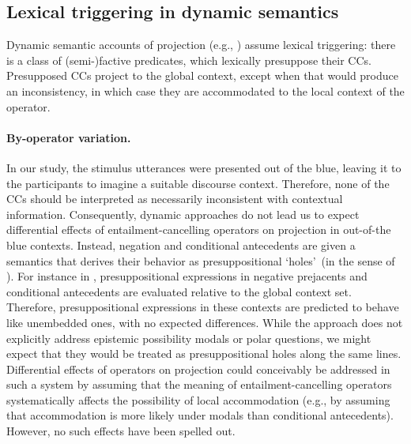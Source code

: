 \documentclass[a4paper,12pt,twoside]{article}
\begin{document}
	\subsection{Lexical triggering in dynamic semantics}

		Dynamic semantic accounts of projection (e.g., \citealt{heim_projection_1983,heim_presupposition_1992,van_der_sandt_presupposition_1992}) assume lexical triggering: there is a class of (semi-)factive predicates, which lexically presuppose their CCs. Presupposed CCs project to the global context, except when that would produce an inconsistency, in which case they are accommodated to the local context of the operator.

		\paragraph{By-operator variation.} In our study, the stimulus utterances were presented out of the blue, leaving it to the participants to imagine a suitable discourse context. Therefore, none of the CCs should be interpreted as necessarily inconsistent with contextual information.
		Consequently, dynamic approaches do not lead us to expect differential effects of entailment-cancelling operators on projection in out-of-the blue contexts. Instead, negation and conditional antecedents are given a semantics that derives their behavior as presuppositional \lq holes\rq\ (in the sense of \citealt{karttunen_observations_1971}). For instance in \citealt{heim_projection_1983}, presuppositional expressions in negative prejacents and conditional antecedents are evaluated relative to the global context set. Therefore, presuppositional expressions in these contexts are predicted to behave like unembedded ones, with no expected differences. While the approach does not explicitly address epistemic possibility modals or polar questions, we might expect that they would be treated as presuppositional holes along the same lines.
		Differential effects of operators on projection could conceivably be addressed in such a system by assuming that the meaning of entailment-cancelling operators systematically affects the possibility of local accommodation (e.g., by assuming that accommodation is more likely under modals than conditional antecedents). However, no such effects have been spelled out.
		
\end{document}
